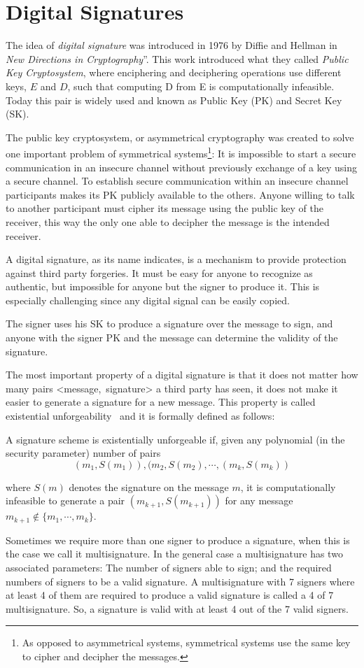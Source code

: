 \section{Digital Signatures}
The idea of \textit{digital signature} was introduced in 1976 by Diffie and
  Hellman in \textit{New Directions in Cryptography}''\cite{diffie1976new}. This work
  introduced what they called \textit{Public Key Cryptosystem}, where enciphering and
  deciphering operations use different keys, $E$ and $D$, such that computing D
  from E is computationally infeasible.
Today this pair is widely used and known as Public Key (PK) and Secret Key (SK).

The public key cryptosystem, or asymmetrical cryptography was created to solve
  one important problem of symmetrical systems\footnote{As opposed to
  asymmetrical systems, symmetrical systems use the same key to cipher and decipher
  the messages.}: It is impossible to start a secure communication in an
  insecure channel without previously exchange of a key using a secure channel.
To establish secure communication within an insecure channel participants makes
  its PK publicly available to the others.
Anyone willing to talk to another participant must cipher its message using the
  public key of the receiver, this way the only one able to decipher the message
  is the intended receiver.

A digital signature, as its name indicates, is a mechanism to provide protection
  against third party forgeries. It must be easy for anyone to recognize as
  authentic, but impossible for anyone but the signer to produce it. This is
  especially challenging since any digital signal can be easily copied.

The signer uses his SK to produce a signature over the message to sign, and
  anyone with the signer PK and the message can determine the validity of the
  signature.

The most important property of a digital signature is that it does not matter how
  many pairs \mbox{\textless message, signature\textgreater} a third party has
  seen, it does not make it easier to generate a signature for a new
  message. This property is called existential unforgeability~\cite{dwork1994efficient}
  and it is formally defined as follows:

A signature scheme is existentially unforgeable if, given any polynomial (in the
  security parameter) number of pairs
$$ (m_{1}, S(m_{1})), (m_{2}, S(m_{2}),\cdots,(m_{k}, S(m_{k})) $$

where $S(m)$ denotes the signature on the message $m$, it is computationally
  infeasible to generate a pair $(m_{k + 1}, S(m_{k+1}))$ for any message
  $m_{k+1} \notin \{m_{1},\cdots,m_{k}\}$.

Sometimes we require more than one signer to produce a signature, when this is
  the case we call it multisignature.
In the general case a multisignature has two associated parameters: The number
  of signers able to sign; and the required numbers of signers to be a valid
  signature.
A multisignature with 7 signers where at least 4 of them are required to produce
  a valid signature is called a 4 of 7 multisignature.
So, a signature is valid with at least 4 out of the 7 valid signers.
